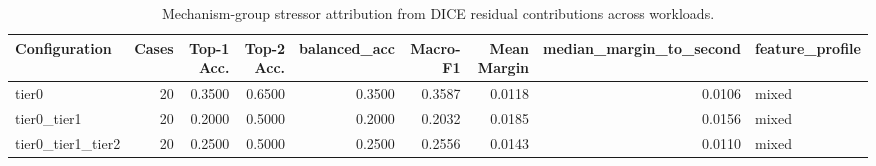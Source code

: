\begin{table}[t]
\centering
\caption{Mechanism-group stressor attribution from DICE residual contributions across workloads.}
\label{tab:dice_stressor_diagnosis}
\footnotesize
\begin{tabular}{lrrrrrrrl}
\toprule
Configuration & Cases & Top-1 Acc. & Top-2 Acc. & balanced_acc & Macro-F1 & Mean Margin & median_margin_to_second & feature_profile \\
\midrule
tier0 & 20 & 0.3500 & 0.6500 & 0.3500 & 0.3587 & 0.0118 & 0.0106 & mixed \\
tier0_tier1 & 20 & 0.2000 & 0.5000 & 0.2000 & 0.2032 & 0.0185 & 0.0156 & mixed \\
tier0_tier1_tier2 & 20 & 0.2500 & 0.5000 & 0.2500 & 0.2556 & 0.0143 & 0.0110 & mixed \\
\bottomrule
\end{tabular}

\end{table}
